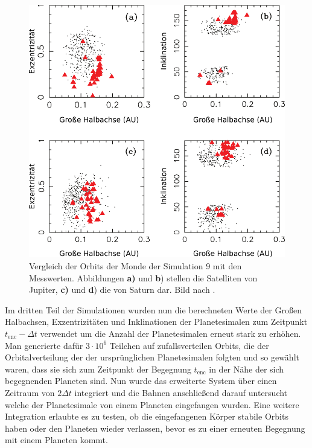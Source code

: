 \documentclass[12pt,a4paper,twoside,open=right,bibliography=totoc]{scrbook}
\renewcommand{\cite}{ \citep}
\begin{document}
\begin{figure}[tbn]
\centering
\includegraphics[scale=0.7]{img/Nesvorny2007-7}
\caption{Vergleich der Orbits der Monde der Simulation 9 mit den Messwerten. Abbildungen \textbf{a)} und \textbf{b}) stellen die Satelliten von Jupiter, \textbf{c)} und \textbf{d}) die von Saturn dar. Bild nach \cite{Nesvorny2007}.} 
\label{fig:Sim9_Mondorbitale}
\end{figure}
Im dritten Teil der Simulationen wurden nun die berechneten Werte der Großen Halbachsen, Exzentrizitäten und Inklinationen der Planetesimalen zum Zeitpunkt $t_{\mathrm{enc}}-\Delta t$ verwendet um die Anzahl der Planetesimalen erneut stark zu erhöhen. Man generierte dafür $3 \cdot 10^6$ Teilchen auf zufallsverteilen Orbits, die der Orbitalverteilung der der ursprünglichen Planetesimalen folgten und so gewählt waren, dass sie sich zum Zeitpunkt der Begegnung $t_{\mathrm{enc}}$ in der Nähe der sich begegnenden Planeten sind.
Nun wurde das erweiterte System über einen Zeitraum von $2 \Delta t$ integriert und die Bahnen anschließend darauf untersucht welche der Planetesimale von einem Planeten eingefangen wurden.
Eine weitere Integration erlaubte es zu testen, ob die eingefangenen Körper stabile Orbits haben oder den Planeten wieder verlassen, bevor es zu einer erneuten Begegnung mit einem Planeten kommt.
\end{document}
